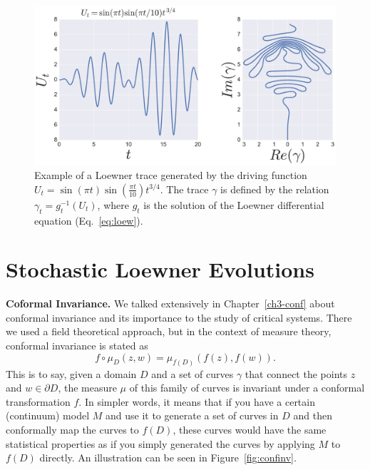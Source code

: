 \begin{figure}
\begin{center}
    \includegraphics[scale=0.4]{chapters/ch4-sle/figs/leexample}
\end{center}
\caption{Example of a Loewner trace generated by the driving function
    $U_t=\sin(\pi t)\sin(\frac{\pi t}{10})t^{3/4}$. The trace $\gamma$ is
    defined by the relation $\gamma_t = g_t^{-1}(U_t)$, where $g_t$ is the
    solution of the Loewner differential equation (Eq.~\ref{eq:loew}).}
\label{fig:leexample}
\end{figure}


\section{Stochastic Loewner Evolutions}
\label{sec:le}

\textbf{Coformal Invariance.}
We talked extensively in Chapter~\ref{ch3-conf} about conformal invariance and
its importance to the study of critical systems. There we used a field
theoretical approach, but in the context of measure theory, conformal
invariance is stated as
\begin{equation}
    \newcommand{\pp}[1]{\left(#1\right)}
    f\circ\mu_D\pp{z,w} = \mu_{f(D)}\pp{f\pp{z}, f\pp{w}}.
\end{equation}
This is to say, given a domain $D$ and a set of curves $\gamma$ that connect
the points $z$ and $w\in\partial D$, the measure $\mu$ of this family of curves
is invariant under a conformal transformation $f$. In simpler words, it means
that if you have a certain (continuum) model $M$ and use it to generate a set
of curves in $D$ and then conformally map the curves to $f(D)$, these
curves would have the same statistical properties as if you simply generated the
curves by applying $M$ to $f(D)$ directly. An illustration can be seen in
Figure~\ref{fig:confinv}.


